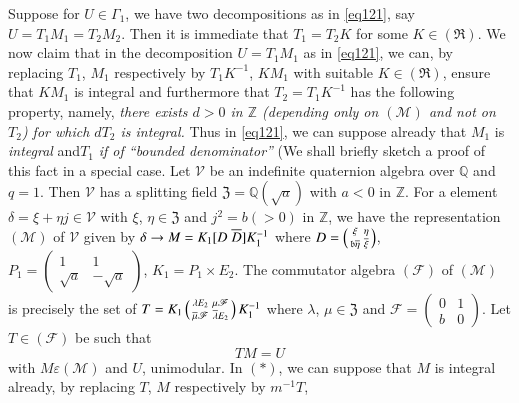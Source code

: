 Suppose for $U\in\Gamma_{1}$, we have two decompositions as in
\eqref{eq121}, say $U=T_{1}M_{1}=T_{2}M_{2}$. Then it is immediate that
$T_{1}=T_{2}K$ for some $K\in(\mathfrak{R})$. We now claim that in the
decomposition $U=T_{1}M_{1}$ as in \eqref{eq121}, we can, by replacing
$T_{1}$, $M_{1}$ respectively by $T_{1}K^{-1}$, $KM_{1}$ with suitable
$K\in(\mathfrak{R})$, ensure that $KM_{1}$ is integral and furthermore
that $T_{2}=T_{1}K^{-1}$ has the following property, namely, {\em
  there exists $d>0$ in $\mathbb{Z}$ (depending only on
  $(\mathscr{M})$ and not on $T_{2}$) for which $dT_{2}$ is integral.}
Thus in \eqref{eq121}, we can suppose already that $M_{1}$ is {\em
  integral} and\pageoriginale $T_{1}$ {\em if of ``bounded
  denominator''} (We shall briefly sketch a proof of this fact in a
special case. Let $\mathscr{V}$ be an indefinite quaternion algebra
over $\mathbb{Q}$ and $q=1$. Then $\mathscr{V}$ has a splitting field
$\mathfrak{Z}=\mathbb{Q}(\sqrt{a})$ with $a<0$ in $\mathbb{Z}$. For a
element $\delta=\xi+\eta j\in\mathscr{V}$ with $\xi$,
$\eta\in\mathfrak{Z}$ and $j^{2}=b(>0)$ in $\mathbb{Z}$, we
have the representation $(\mathscr{M})$ of $\mathscr{V}$ given by
$\delta\to M=K_{1}[D \; \overline{D}]K^{-1}_{1}$ where
$D=\left(\begin{smallmatrix} \xi & \eta\\ \mathfrak{b}\overline{\eta}
  &\overline{\xi}\end{smallmatrix}\right)$, $P_{1}=\left(\begin{smallmatrix}
  1 & 1 \\ \sqrt{a} & -\sqrt{a}\end{smallmatrix}\right)$,
$K_{1}=P_{1}\times E_{2}$. The commutator algebra $(\mathscr{F})$ of
$(\mathscr{M})$ is precisely the set of
$T=K_{1}\left(\begin{smallmatrix} \lambda E_{2} &
  \mu\mathscr{F}\\ \overline{\mu}\mathscr{F} & \overline{\lambda}E_{2}
\end{smallmatrix}\right)K^{-1}_{1}$  where $\lambda$,
$\mu\in\mathfrak{Z}$ and $\mathscr{F}=\left(\begin{smallmatrix} 0 &
  1\\ b &0\end{smallmatrix}\right)$. Let $T\in(\mathscr{F})$ be such
  that
\begin{equation*}
TM=U\tag{$\ast$}
\end{equation*}
with $M \varepsilon (\mathscr{M})$ and $U$, unimodular. In $(\ast)$,
we can suppose that $M$ is 
integral already, by replacing $T$, $M$ respectively by $m^{-1}T$,
